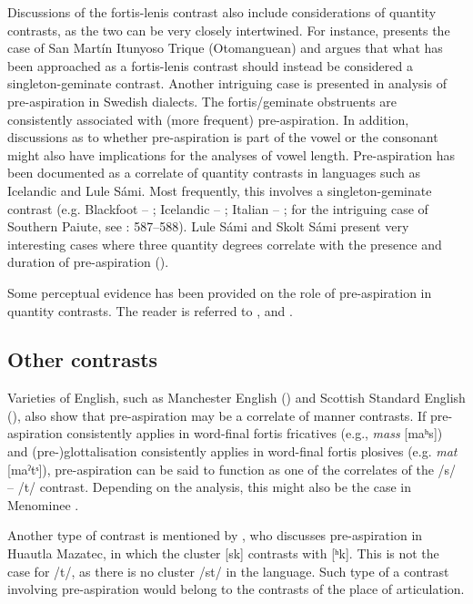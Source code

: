 \documentclass[output=paper]{langscibook}
\begin{document}
Discussions of the fortis-lenis contrast also include considerations of quantity contrasts, as the two can be very closely intertwined. For instance, \citet{DiCanio2012} presents the case of San Martín Itunyoso Trique (Otomanguean) and argues that what has been approached as a fortis-lenis contrast should instead be considered a singleton-geminate contrast. Another intriguing case is presented in  analysis of pre\hyp aspiration in Swedish dialects. The fortis/geminate obstruents are consistently associated with (more frequent) pre-aspiration. In addition, discussions as to whether pre\hyp aspiration is part of the vowel or the consonant might also have implications for the analyses of vowel length. Pre-aspiration has been documented as a correlate of quantity contrasts in languages such as Icelandic and Lule Sámi. Most frequently, this involves a singleton-geminate contrast (e.g. Blackfoot – \citealt{ReisSilva2008}; Icelandic – \citealt{Silverman2003}; Italian – \citealt{Stevens2010, StevensReubold2014}; for the intriguing case of Southern Paiute, see \citealt{Silverman2003}: 587--588). Lule Sámi and Skolt Sámi present very interesting cases where three quantity degrees correlate with the presence and duration of pre\hyp aspiration (\citealt{Engstrand1987, McRobbie-Utasi2003}). 

Some perceptual evidence has been provided on the role of pre\hyp aspiration in quantity contrasts. The reader is referred to \textcite[Ch. 3]{Helgason2002}, \textcite{Pind1996Rate, Pind1996RateQuantity} and \citet{StevensReubold2014}.

\subsection{Other contrasts}\label{sec:hejna:3.4}

Varieties of English, such as Manchester English (\citealt{HejnáScanlon2015}) and Scottish Standard English (\citealt{GordeevaScobbie2013}), also show that pre\hyp aspiration may be a correlate of manner contrasts. If pre\hyp aspiration consistently applies in word-final fortis fricatives (e.g., \textit{mass} [maʰs]) and (pre-)glottalisation consistently applies in word-final fortis plosives (e.g. \textit{mat} [maˀtˢ]), pre\hyp aspiration can be said to function as one of the correlates of the /s/ -- /t/ contrast. Depending on the analysis, this might also be the case in Menominee \citep{Gathercole1983}.

Another type of contrast is mentioned by \citet[590]{Silverman2003}, who discusses pre\hyp aspiration in Huautla Mazatec, in which the cluster [sk] contrasts with [ʰk]. This is not the case for /t/, as there is no cluster /st/ in the language. Such type of a contrast involving pre\hyp aspiration would belong to the contrasts of the place of articulation.
\end{document}
